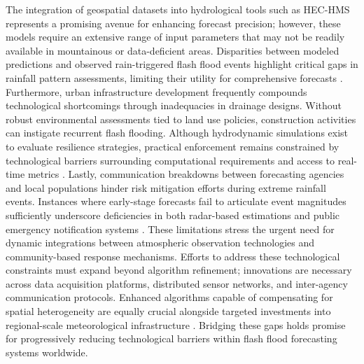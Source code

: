 The integration of geospatial datasets into hydrological tools such as HEC-HMS represents a promising avenue for enhancing forecast precision; however, these models require an extensive range of input parameters that may not be readily available in mountainous or data-deficient areas. Disparities between modeled predictions and observed rain-triggered flash flood events highlight critical gaps in rainfall pattern assessments, limiting their utility for comprehensive forecasts \citep{AlRawas2024}.
Furthermore, urban infrastructure development frequently compounds technological shortcomings through inadequacies in drainage designs. Without robust environmental assessments tied to land use policies, construction activities can instigate recurrent flash flooding. Although hydrodynamic simulations exist to evaluate resilience strategies, practical enforcement remains constrained by technological barriers surrounding computational requirements and access to real-time metrics \citep{Saad2024}.
Lastly, communication breakdowns between forecasting agencies and local populations hinder risk mitigation efforts during extreme rainfall events. Instances where early-stage forecasts fail to articulate event magnitudes sufficiently underscore deficiencies in both radar-based estimations and public emergency notification systems \citep{Burke2024}. These limitations stress the urgent need for dynamic integrations between atmospheric observation technologies and community-based response mechanisms.
Efforts to address these technological constraints must expand beyond algorithm refinement; innovations are necessary across data acquisition platforms, distributed sensor networks, and inter-agency communication protocols. Enhanced algorithms capable of compensating for spatial heterogeneity are equally crucial alongside targeted investments into regional-scale meteorological infrastructure \citep{Borga2019}\citep{Fowler2021}\citep{Georgakakos2022}. Bridging these gaps holds promise for progressively reducing technological barriers within flash flood forecasting systems worldwide.

